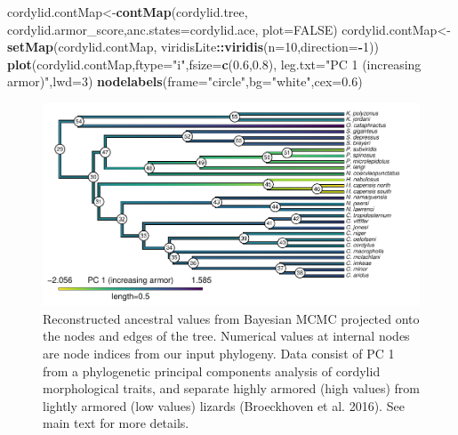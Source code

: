 \documentclass[fleqn,10pt,lineno]{wlpeerj} %
\newenvironment{Shaded}{\begin{snugshade}}{\end{snugshade}}
\newcommand{\AttributeTok}[1]{\textcolor[rgb]{0.13,0.29,0.53}{#1}}
\newcommand{\ConstantTok}[1]{\textcolor[rgb]{0.56,0.35,0.01}{#1}}
\newcommand{\DecValTok}[1]{\textcolor[rgb]{0.00,0.00,0.81}{#1}}
\newcommand{\FloatTok}[1]{\textcolor[rgb]{0.00,0.00,0.81}{#1}}
\newcommand{\FunctionTok}[1]{\textcolor[rgb]{0.13,0.29,0.53}{\textbf{#1}}}
\newcommand{\NormalTok}[1]{#1}
\newcommand{\OtherTok}[1]{\textcolor[rgb]{0.56,0.35,0.01}{#1}}
\newcommand{\SpecialCharTok}[1]{\textcolor[rgb]{0.81,0.36,0.00}{\textbf{#1}}}
\newcommand{\StringTok}[1]{\textcolor[rgb]{0.31,0.60,0.02}{#1}}
\begin{document}
\begin{Shaded}
\begin{Highlighting}[]
\NormalTok{cordylid.contMap}\OtherTok{\textless{}{-}}\FunctionTok{contMap}\NormalTok{(cordylid.tree,}
\NormalTok{  cordylid.armor\_score,}\AttributeTok{anc.states=}\NormalTok{cordylid.ace,}
  \AttributeTok{plot=}\ConstantTok{FALSE}\NormalTok{)}
\NormalTok{cordylid.contMap}\OtherTok{\textless{}{-}}\FunctionTok{setMap}\NormalTok{(cordylid.contMap,}
\NormalTok{  viridisLite}\SpecialCharTok{::}\FunctionTok{viridis}\NormalTok{(}\AttributeTok{n=}\DecValTok{10}\NormalTok{,}\AttributeTok{direction=}\SpecialCharTok{{-}}\DecValTok{1}\NormalTok{))}
\FunctionTok{plot}\NormalTok{(cordylid.contMap,}\AttributeTok{ftype=}\StringTok{"i"}\NormalTok{,}\AttributeTok{fsize=}\FunctionTok{c}\NormalTok{(}\FloatTok{0.6}\NormalTok{,}\FloatTok{0.8}\NormalTok{),}
  \AttributeTok{leg.txt=}\StringTok{"PC 1 (increasing armor)"}\NormalTok{,}\AttributeTok{lwd=}\DecValTok{3}\NormalTok{)}
\FunctionTok{nodelabels}\NormalTok{(}\AttributeTok{frame=}\StringTok{"circle"}\NormalTok{,}\AttributeTok{bg=}\StringTok{"white"}\NormalTok{,}\AttributeTok{cex=}\FloatTok{0.6}\NormalTok{)}
\end{Highlighting}
\end{Shaded}

\begin{figure}
\includegraphics[width=1\linewidth]{Revell.phytools-v2_peerj_files/figure-latex/cordylid-ace-1} \caption{Reconstructed ancestral values from Bayesian MCMC projected onto the nodes and edges of the tree. Numerical values at internal nodes are node indices from our input phylogeny. Data consist of PC 1 from a phylogenetic principal components analysis of cordylid morphological traits, and separate highly armored (high values) from lightly armored (low values) lizards (Broeckhoven et al. 2016). See main text for more details.}\label{fig:cordylid-ace}
\end{figure}
\end{document}
